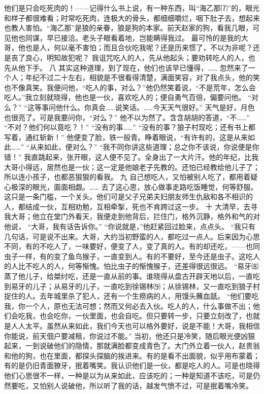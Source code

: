\documentclass[12pt,UTF8]{ctexbook}
\begin{document}
他们是只会吃死肉的！——记得什么书上说，有一种东西，叫“海乙那⑺”的，眼光和样子都很难看；时常吃死肉，连极大的骨头，都细细嚼烂，咽下肚子去，想起来也教人害怕。“海乙那”是狼的亲眷，狼是狗的本家。前天赵家的狗，看我几眼，可见他也同谋，早已接洽。老头子眼看着地，岂能瞒得我过。
最可怜的是我的大哥，他也是人，何以毫不害怕；而且合伙吃我呢？还是历来惯了，不以为非呢？还是丧了良心，明知故犯呢？
我诅咒吃人的人，先从他起头；要劝转吃人的人，也先从他下手。
八
其实这种道理，到了现在，他们也该早已懂得，……
忽然来了一个人；年纪不过二十左右，相貌是不很看得清楚，满面笑容，对了我点头，他的笑也不像真笑。我便问他，“吃人的事，对么？”他仍然笑着说，“不是荒年，怎么会吃人。”我立刻就晓得，他也是一伙，喜欢吃人的；便自勇气百倍，偏要问他。
“对么？”
“这等事问他什么。你真会……说笑话。……今天天气很好。”
天气是好，月色也很亮了。可是我要问你，“对么？”
他不以为然了。含含胡胡的答道，“不……”
“不对？他们何以竟吃？！”
“没有的事……”
“没有的事？狼子村现吃；还有书上都写着，通红斩新！”
他便变了脸，铁一般青。睁着眼说，“有许有的，这是从来如此……”
“从来如此，便对么？”
“我不同你讲这些道理；总之你不该说，你说便是你错！”
我直跳起来，张开眼，这人便不见了。全身出了一大片汗。他的年纪，比我大哥小得远，居然也是一伙；这一定是他娘老子先教的。还怕已经教给他儿子了；所以连小孩子，也都恶狠狠的看我。
九
自己想吃人，又怕被别人吃了，都用着疑心极深的眼光，面面相觑。……
去了这心思，放心做事走路吃饭睡觉，何等舒服。这只是一条门槛，一个关头。他们可是父子兄弟夫妇朋友师生仇敌和各不相识的人，都结成一伙，互相劝勉，互相牵掣，死也不肯跨过这一步。
十
大清早，去寻我大哥；他立在堂门外看天，我便走到他背后，拦住门，格外沉静，格外和气的对他说，
“大哥，我有话告诉你。”
“你说就是，”他赶紧回过脸来，点点头。
“我只有几句话，可是说不出来。大哥，大约当初野蛮的人，都吃过一点人。后来因为心思不同，有的不吃人了，一味要好，便变了人，变了真的人。有的却还吃，——也同虫子一样，有的变了鱼鸟猴子，一直变到人。有的不要好，至今还是虫子。这吃人的人比不吃人的人，何等惭愧。怕比虫子的惭愧猴子，还差得很远很远。
“易牙⑻蒸了他儿子，给桀纣吃，还是一直从前的事。谁晓得从盘古开辟天地以后，一直吃到易牙的儿子；从易牙的儿子，一直吃到徐锡林⑼；从徐锡林，又一直吃到狼子村捉住的人。去年城里杀了犯人，还有一个生痨病的人，用馒头蘸血舐。
“他们要吃我，你一个人，原也无法可想；然而又何必去入伙。吃人的人，什么事做不出；他们会吃我，也会吃你，一伙里面，也会自吃。但只要转一步，只要立刻改了，也就是人人太平。虽然从来如此，我们今天也可以格外要好，说是不能！大哥，我相信你能说，前天佃户要减租，你说过不能。”
当初，他还只是冷笑，随后眼光便凶狠起来，一到说破他们的隐情，那就满脸都变成青色了。大门外立着一伙人，赵贵翁和他的狗，也在里面，都探头探脑的挨进来。有的是看不出面貌，似乎用布蒙着；有的是仍旧青面獠牙，抿着嘴笑。我认识他们是一伙，都是吃人的人。可是也晓得他们心思很不一样，一种是以为从来如此，应该吃的；一种是知道不该吃，可是仍然要吃，又怕别人说破他，所以听了我的话，越发气愤不过，可是抿着嘴冷笑。
\end{document}

